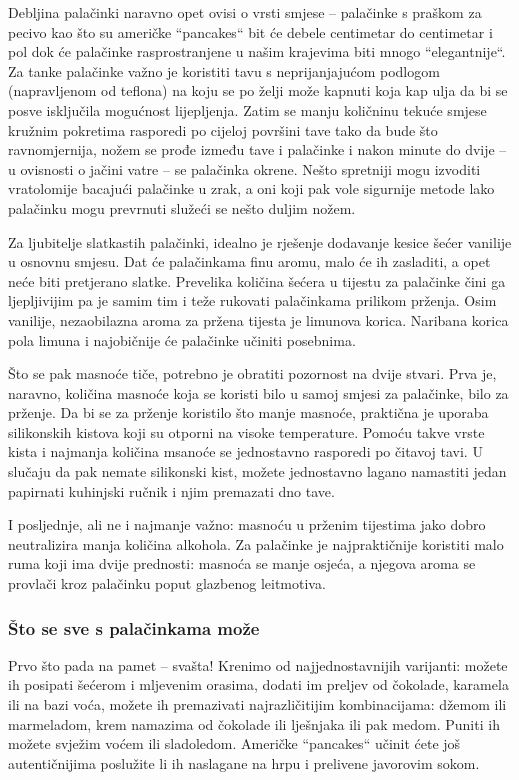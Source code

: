 \documentclass[11pt,twocolumn,english]{article}
\begin{document}
Debljina palačinki naravno opet ovisi o vrsti smjese – palačinke s
praškom za pecivo kao što su američke “pancakes“ bit će debele centimetar do centimetar i
pol dok će palačinke rasprostranjene u našim krajevima biti mnogo “elegantnije“.
Za tanke palačinke važno je koristiti tavu s neprijanjajućom podlogom
(napravljenom od teflona) na koju se po želji može kapnuti koja kap ulja da bi se
posve isključila mogućnost lijepljenja. Zatim se manju količninu tekuće smjese
kružnim pokretima rasporedi po cijeloj površini tave tako da bude što
ravnomjernija, nožem se prođe između tave i palačinke i nakon minute do dvije – u
ovisnosti o jačini vatre – se palačinka okrene. Nešto spretniji mogu izvoditi
vratolomije bacajući palačinke u zrak, a oni koji pak vole sigurnije metode lako
palačinku mogu prevrnuti služeći se nešto duljim nožem.

Za ljubitelje slatkastih palačinki, idealno je rješenje dodavanje kesice šećer
vanilije u osnovnu smjesu. Dat će palačinkama finu aromu, malo će ih zasladiti, a
opet neće biti pretjerano slatke. Prevelika količina šećera u tijestu za
palačinke čini ga ljepljivijim pa je samim tim i teže rukovati palačinkama
prilikom prženja. Osim vanilije, nezaobilazna aroma za pržena tijesta je limunova
korica. Naribana korica pola limuna i najobičnije će palačinke učiniti posebnima.

Što se pak masnoće tiče, potrebno je obratiti pozornost na dvije stvari. Prva je,
naravno, količina masnoće koja se koristi bilo u samoj smjesi za palačinke, bilo
za prženje. Da bi se za prženje koristilo što manje masnoće, praktična je uporaba
silikonskih kistova koji su otporni na visoke temperature. Pomoću takve vrste
kista i najmanja količina msanoće se jednostavno rasporedi po čitavoj tavi. U
slučaju da pak nemate silikonski kist, možete jednostavno lagano namastiti jedan
papirnati kuhinjski ručnik i njim premazati dno tave.

I posljednje, ali ne i najmanje važno: masnoću u prženim tijestima jako dobro
neutralizira manja količina alkohola. Za palačinke je najpraktičnije koristiti
malo ruma koji ima dvije prednosti: masnoća se manje osjeća, a njegova aroma se
provlači kroz palačinku poput glazbenog leitmotiva.

\subsubsection{Što se sve s palačinkama može}
Prvo što pada na pamet – svašta! Krenimo od najjednostavnijih varijanti: možete
ih posipati šećerom i mljevenim orasima, dodati im preljev od čokolade, karamela
ili na bazi voća, možete ih premazivati najrazličitijim kombinacijama: džemom ili
marmeladom, krem namazima od čokolade ili lješnjaka ili pak medom. Puniti ih
možete svježim voćem ili sladoledom. Američke “pancakes“ učinit ćete još
autentičnijima poslužite li ih naslagane na hrpu i prelivene javorovim sokom.
\end{document}
